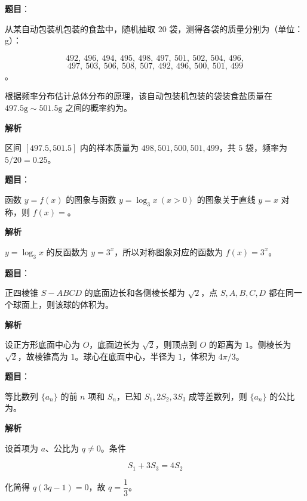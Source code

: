 \begin{answer}

\textbf{题目}：

从某自动包装机包装的食盐中，随机抽取 $20$ 袋，测得各袋的质量分别为（单位：g）：

\nopagebreak[4]
\[
492,\ 496,\ 494,\ 495,\ 498,\ 497,\ 501,\ 502,\ 504,\ 496,
\]
\nopagebreak[4]
\[
497,\ 503,\ 506,\ 508,\ 507,\ 492,\ 496,\ 500,\ 501,\ 499
\]
。

根据频率分布估计总体分布的原理，该自动包装机包装的袋装食盐质量在 $497.5\mathrm{g}\sim501.5\mathrm{g}$ 之间的概率约为\gkblank{}。

\textbf{解析}

区间 $[497.5,501.5]$ 内的样本质量为 $498,501,500,501,499$，共 $5$ 袋，频率为 $5/20=0.25$。


\end{answer}
\begin{answer}

\textbf{题目}：

函数 $y=f(x)$ 的图象与函数 $y=\log_3x\ (x>0)$ 的图象关于直线 $y=x$ 对称，则 $f(x)=$\gkblank{}。

\textbf{解析}

$y=\log_3x$ 的反函数为 $y=3^x$，所以对称图象对应的函数为 $f(x)=3^x$。


\end{answer}
\begin{answer}

\textbf{题目}：

正四棱锥 $S-ABCD$ 的底面边长和各侧棱长都为 $\sqrt2$，点 $S,A,B,C,D$ 都在同一个球面上，则该球的体积为\gkblank{}。

\textbf{解析}

设正方形底面中心为 $O$，底面边长为 $\sqrt2$，则顶点到 $O$ 的距离为 $1$。侧棱长为 $\sqrt2$，故棱锥高为 $1$。球心在底面中心，半径为 $1$，体积为 $4\pi/3$。


\end{answer}
\begin{answer}

\textbf{题目}：

等比数列 $\{a_n\}$ 的前 $n$ 项和 $S_n$，已知 $S_1,2S_2,3S_3$ 成等差数列，则 $\{a_n\}$ 的公比为\gkblank{}。

\textbf{解析}

设首项为 $a$、公比为 $q\ne0$。条件

\nopagebreak[4]
\[
S_1+3S_3=4S_2
\]

化简得 $q(3q-1)=0$，故 $q=\dfrac13$。


\end{answer}
